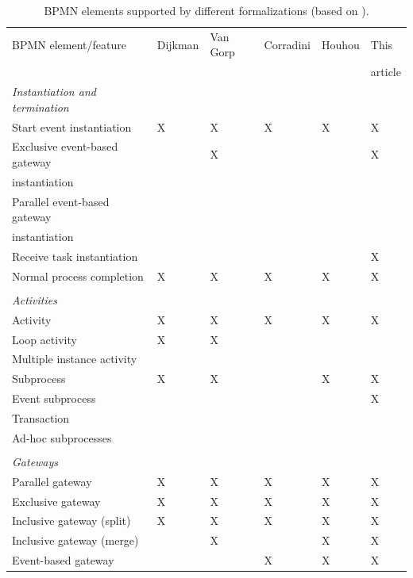 \documentclass{lmcs} %
\begin{document}
\begin{table}[htbp]
    \caption{BPMN elements supported by different formalizations (based on \cite{vangorpVisualTokenbasedFormalization2013}).}
    \label{tab:supportedelements}
    \begin{threeparttable}
    \begin{tabular}{l l l l l l}
    \hline
      BPMN element/feature & Dijkman & Van Gorp &  Corradini & Houhou & This\\
      & \cite{dijkmanSemanticsAnalysisBusiness2008} & \cite{vangorpVisualTokenbasedFormalization2013} & \cite{corradiniFormalApproachAnalysis2021}&  \cite{houhouFirstOrderLogicVerification2022} & article\\
      \hline
      \textit{Instantiation and termination}\\
      Start event instantiation & X & X & X & X & X\\
      Exclusive event-based gateway & & X & & & X \\
        \quad instantiation \\
      Parallel event-based gateway & & & & & \\
        \quad instantiation \\
      Receive task instantiation & & & & & X\\
      Normal process completion & X & X & X & X & X\\
      \\
      \textit{Activities}\\
      Activity & X & X & X & X & X\\
      Loop activity & X & X & & &\\
      Multiple instance activity & & & & & \\
      Subprocess & X & X & & X & X\\
      Event subprocess & &  &  &  & X\\
      Transaction & &  &  &  & \\
      Ad-hoc subprocesses & & & & &\\
      \\
      \textit{Gateways}\\
      Parallel gateway & X & X & X & X & X\\
      Exclusive gateway & X & X & X & X & X\\
      Inclusive gateway (split) & X & X & X & X & X\\
      Inclusive gateway (merge) & & X & & X & X\\
      Event-based gateway & & & X\tnote{1} & X & X\\ %

\end{tabular}
\end{threeparttable}
\end{table}
\end{document}
